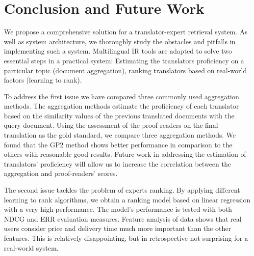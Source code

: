 \section{Conclusion and Future Work}
\label{sec:conclusion}
We propose a comprehensive solution for a translator-expert retrieval system. As well as system architecture, we thoroughly study the obstacles and pitfalls in implementing such a system. Multilingual IR tools are adapted to solve two essential steps in a practical system: Estimating the translators proficiency on a particular topic (document aggregation), ranking translators based on real-world factors (learning to rank).  %

To address the first issue we have compared three commonly used aggregation methods. The aggregation methods estimate the proficiency of each translator based on the similarity values of the previous translated documents with the query document. Using the assessment of the proof-readers on the final translation as the gold standard, we compare three aggregation methods. We found that the GP2 method shows better performance in comparison to the others with reasonable good results. Future work in addressing the estimation of translators' proficiency will allow us to increase the correlation between the aggregation and proof-readers' scores.

The second issue tackles the problem of experts ranking. By applying different learning to rank algorithms, we obtain a ranking model based on linear regression with a very high performance. The model's performance is tested with both NDCG and ERR evaluation measures. Feature analysis of data shows that real users consider  price and delivery time much more important than the other features. This is relatively disappointing, but in retrospective not surprising for a real-world system.

